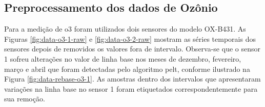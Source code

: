 \subsection{Preprocessamento dos dados de Ozônio}

Para a medição de \acrshort{o3} foram utilizados dois sensores do modelo OX-B431. As Figuras \ref{fig:data-o3-1-raw} e \ref{fig:data-o3-2-raw} mostram as séries temporais dos sensores depois de removidos os valores fora de intervalo. Observa-se que o sensor 1 sofreu alterações no valor de linha base nos meses de dezembro, fevereiro, março e abril que foram detectadas pelo algoritmo \acrshort{pelt}, conforme ilustrado na Figura \ref{fig:data-rebase-o3-1}. As amostras dentro dos intervalos que apresentaram variações na linha base no sensor 1 foram etiquetados correspondentemente para sua remoção.

